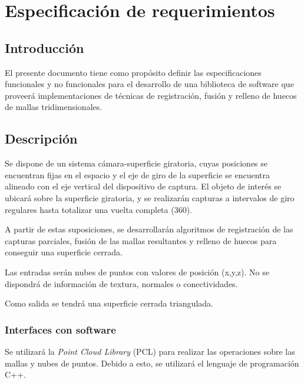 \chapter{Especificación de requerimientos}

	\section{Introducción}
	El presente documento tiene como propósito definir las especificaciones
	funcionales y no funcionales para el desarrollo de una biblioteca de
	software que proveerá implementaciones de técnicas de registración, fusión
	y relleno de huecos de mallas tridimensionales.

	\section{Descripción}
		Se dispone de un sistema cámara-superficie giratoria, cuyas posiciones
		se encuentran fijas en el espacio y el eje de giro de la superficie se
		encuentra alineado con el eje vertical del dispositivo de captura.
		El objeto de interés se ubicará sobre la superficie giratoria, y se
		realizarán capturas a intervalos de giro regulares
		hasta totalizar una vuelta completa (360\textdegree).

		A partir de estas suposiciones, se desarrollarán algoritmos de
		registración de las capturas parciales,
		fusión de las mallas resultantes
		y relleno de huecos para conseguir una superficie cerrada.

		Las entradas serán nubes de puntos con valores de posición (x,y,z).
		No se dispondrá de información de textura, normales o conectividades. %

		Como salida se tendrá una superficie cerrada triangulada.

		\subsection{Interfaces con software}
			Se utilizará la \emph{Point Cloud Library} (PCL)
			para realizar las operaciones sobre las mallas y nubes de puntos.
			Debido a esto, se utilizará el lenguaje de programación C++.


